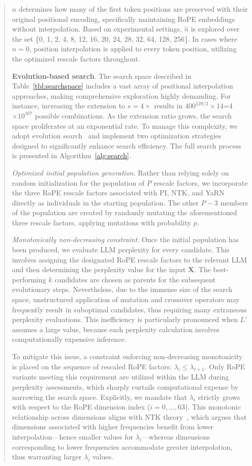 \begin{abstract}
$\hat{n}$ determines how many of the first token positions are preserved with their original positional encoding, specifically maintaining RoPE embeddings without interpolation. Based on experimental settings, $\hat{n}$ is explored over the set \{0, 1, 2, 4, 8, 12, 16, 20, 24, 28, 32, 64, 128, 256\}. In cases where $\hat{n}=0$, position interpolation is applied to every token position, utilizing the optimized rescale factors throughout.

\textbf{Evolution-based search}. The search space described in Table~\ref{tbl:searchspace} includes a vast array of positional interpolation approaches, making comprehensive exploration highly demanding. For instance, increasing the extension to $s=4\times$ results in $400^{128/2}\times14$=4$\times10^{167}$ possible combinations. As the extension ratio grows, the search space proliferates at an exponential rate. To manage this complexity, we adopt evolution search~\cite{guo2020single} and implement two optimization strategies designed to significantly enhance search efficiency. The full search process is presented in Algorithm~\ref{alg:search}.

\textit{Optimized initial population generation}. Rather than relying solely on random initialization for the population of $P$ rescale factors, we incorporate the three RoPE rescale factors associated with PI, NTK, and YaRN directly as individuals in the starting population. The other $P-3$ members of the population are created by randomly mutating the aforementioned three rescale factors, applying mutations with probability $p$.

\textit{Monotonically non-decreasing constraint}. Once the initial population has been produced, we evaluate LLM perplexity for every candidate. This involves assigning the designated RoPE rescale factors to the relevant LLM and then determining the perplexity value for the input $\mathbf{X}$. The best-performing $k$ candidates are chosen as parents for the subsequent evolutionary steps. Nevertheless, due to the immense size of the search space, unstructured application of mutation and crossover operators may frequently result in suboptimal candidates, thus requiring many extraneous perplexity evaluations. This inefficiency is particularly pronounced when $L'$ assumes a large value, because each perplexity calculation involves computationally expensive inference.

To mitigate this issue, a constraint enforcing non-decreasing monotonicity is placed on the sequence of rescaled RoPE factors: $\lambda_i\le \lambda_{i+1}$. Only RoPE variants meeting this requirement are utilized within the LLM during perplexity assessments, which sharply curtails computational expense by narrowing the search space. Explicitly, we mandate that $\lambda_i$ strictly grows with respect to the RoPE dimension index ($i = 0, \ldots, 63$). This monotonic relationship across dimensions aligns with NTK theory~\cite{jacot2018neural,tancik2020fourier,ntk}, which argues that dimensions associated with higher frequencies benefit from lower interpolation—hence smaller values for $\lambda_i$—whereas dimensions corresponding to lower frequencies accommodate greater interpolation, thus warranting larger $\lambda_i$ values.


\end{abstract}
